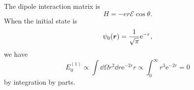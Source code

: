 \documentclass[hyperref, a4paper]{article}
\newcommand*{\ee}{\mathrm{e}}
\begin{document}
\section{}

\subsection{}

The dipole interaction matrix is 
\begin{equation}
    H = - e r \mathcal{E} \cos \theta .
\end{equation}
When the initial state is 
\begin{equation}
    \psi_0(\vb*{r}) = \frac{1}{\sqrt{\pi}} \ee^{- r},
\end{equation}
we have 
\begin{equation}
    E_0^{(1)} \propto \int \dd{\Omega} r^2 \dd{r} \ee^{- 2 r} r 
    \propto \int_{0}^{\infty} r^3 \ee^{- 2 r} 
    = 0
\end{equation}
by integration by parts.

\subsection{}
\end{document}
